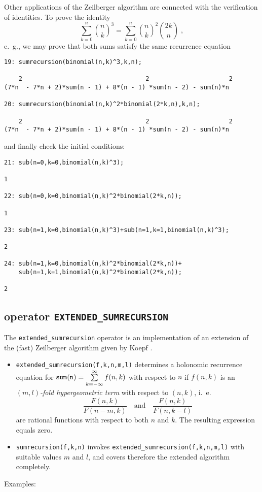 Other applications of the Zeilberger algorithm are connected with
the verification of identities. To prove the identity
\[
\sum_{k=0}^n
\binom{n}{k}^3
=
\sum_{k=0}^n
\binom{n}{k}^2 \binom{2k}{n}
\;,
\]
e.\ g., we may prove that both sums satisfy the same recurrence equation

{\small
\begin{verbatim}
19: sumrecursion(binomial(n,k)^3,k,n);

    2                                  2                      2
(7*n  - 7*n + 2)*sum(n - 1) + 8*(n - 1) *sum(n - 2) - sum(n)*n

20: sumrecursion(binomial(n,k)^2*binomial(2*k,n),k,n);

    2                                  2                      2
(7*n  - 7*n + 2)*sum(n - 1) + 8*(n - 1) *sum(n - 2) - sum(n)*n
\end{verbatim}
}\noindent
and finally check the initial conditions:

{\small
\begin{verbatim}
21: sub(n=0,k=0,binomial(n,k)^3);

1

22: sub(n=0,k=0,binomial(n,k)^2*binomial(2*k,n));

1

23: sub(n=1,k=0,binomial(n,k)^3)+sub(n=1,k=1,binomial(n,k)^3);

2

24: sub(n=1,k=0,binomial(n,k)^2*binomial(2*k,n))+
    sub(n=1,k=1,binomial(n,k)^2*binomial(2*k,n));

2
\end{verbatim}
}\noindent

\subsection{\REDUCE{} operator {\tt EXTENDED\_SUMRECURSION}}
\label{sec:EXTENDED_SUMRECURSION}

The {\tt extended\_sumrecursion} operator is an implementation 
of an extension of the (fast) Zeilberger algorithm given by Koepf
\cite{Koepf}.
\begin{itemize}
\item
{\tt extended\_sumrecursion(f,k,n,m,l)} determines a holonomic recurrence 
equation for ${\tt sum(n)} =\sum\limits_{k=-\infty}^\infty f(n,k)$ 
with respect to $n$ if $f(n,k)$ is an {\sl $(m,l)$-fold hypergeometric term} 
with respect to $(n,k)$, i.\ e.\
\[
\frac{F(n,k)}{F(n-m,k)}
\quad
\mbox{and}
\quad
\frac{F(n,k)}{F(n,k-l)}
\]
are rational functions with respect to both $n$ and $k$.
The resulting expression equals zero.
\item
{\tt sumrecursion(f,k,n)} invokes {\tt extended\_sumrecursion(f,k,n,m,l)}
with suitable values $m$ and $l$, and covers therefore the extended
algorithm completely.
\end{itemize}
Examples:

